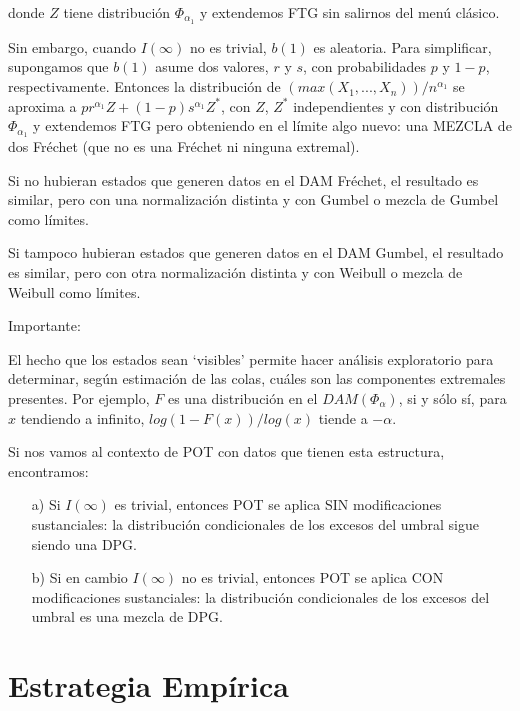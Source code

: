 \documentclass[
  12pt]{article}
\begin{document}
donde \(Z\) tiene distribución \(\Phi_{\alpha_1}\) y extendemos FTG sin
salirnos del menú clásico.

Sin embargo, cuando \(I(\infty)\) no es trivial, \(b(1)\) es aleatoria.
Para simplificar, supongamos que \(b(1)\) asume dos valores, \(r\) y
\(s\), con probabilidades \(p\) y \(1-p\), respectivamente. Entonces la
distribución de \((max(X_1,...,X_n))/ n^{\alpha_1}\) se aproxima a
\(p r^{\alpha_1} Z+ (1-p) s^{\alpha_1} Z^*\), con \(Z\), \(Z^*\)
independientes y con distribución \(\Phi_{\alpha_1}\) y extendemos FTG
pero obteniendo en el límite algo nuevo: una MEZCLA de dos Fréchet (que
no es una Fréchet ni ninguna extremal).

Si no hubieran estados que generen datos en el DAM Fréchet, el resultado
es similar, pero con una normalización distinta y con Gumbel o mezcla de
Gumbel como límites.

Si tampoco hubieran estados que generen datos en el DAM Gumbel, el
resultado es similar, pero con otra normalización distinta y con Weibull
o mezcla de Weibull como límites.

Importante:

El hecho que los estados sean `visibles' permite hacer análisis
exploratorio para determinar, según estimación de las colas, cuáles son
las componentes extremales presentes. Por ejemplo, \(F\) es una
distribución en el \(DAM(\Phi_{\alpha})\), si y sólo sí, para \(x\)
tendiendo a infinito, \(log (1-F(x))/log(x)\) tiende a \(-\alpha\).

Si nos vamos al contexto de POT con datos que tienen esta estructura,
encontramos:

\begin{itemize}
\item[a)] Si $I(\infty)$ es trivial, entonces POT se aplica SIN modificaciones sustanciales: la distribución condicionales de los excesos del umbral sigue siendo una DPG.
\item[b)] Si en cambio $I(\infty)$ no es trivial, entonces POT se aplica CON modificaciones sustanciales: la distribución condicionales de los excesos del umbral es una mezcla de DPG.
\end{itemize}

\newpage

\section{Estrategia Empírica}

\newpage
\end{document}
